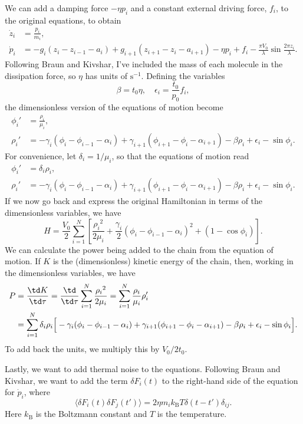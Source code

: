 \documentclass[11pt]{article}
\begin{document}
We can add a damping force $-\eta p_i$ and a constant external driving force, $f_i$, to the original equations, to obtain
\begin{align*}
\dot{z}_i&=\frac{p_i}{m_i},\\
\dot{p}_i&=-g_i(z_i-z_{i-1}-a_i)
	+g_{i+1}(z_{i+1}-z_i-a_{i+1})
	-\eta p_i+f_i
	-\frac{\pi V_0}{\lambda}\sin\frac{2\pi z_i}{\lambda}.
\end{align*}
Following Braun and Kivshar, I've included the mass of each molecule in the dissipation force, so $\eta$ has units of $\text{s}^{-1}$. Defining the variables
\[
\beta=t_0\eta,\quad
\epsilon_i = \frac{t_0}{p_0}f_i,
\]
the dimensionless version of the equations of motion become
\begin{align*}
\phi_i'&=\frac{\rho_i}{\mu_i},\\
\rho_i'&=-\gamma_i(\phi_i-\phi_{i-1}-\alpha_i)
	+\gamma_{i+1}(\phi_{i+1}-\phi_i-\alpha_{i+1})
	-\beta\rho_i+\epsilon_i
	-\sin\phi_i.
\end{align*}
For convenience, let $\delta_i=1/\mu_i$, so that the equations of motion read
\begin{align*}
\phi_i'&=\delta_i\rho_i,\\
\rho_i'&=-\gamma_i(\phi_i-\phi_{i-1}-\alpha_i)
	+\gamma_{i+1}(\phi_{i+1}-\phi_i-\alpha_{i+1})
	-\beta\rho_i+\epsilon_i
	-\sin\phi_i.
\end{align*}
If we now go back and express the original Hamiltonian in terms of the dimensionless variables, we have
\[
H=\frac{V_0}{2}\sum_{i=1}^N
	\left[\frac{{\rho_i}^2}{2\mu_i}
	+\frac{\gamma_i}{2}\left(\phi_i-\phi_{i-1}-\alpha_i\right)^2
	+\left(1-\cos\phi_i\right)\right].
\]
We can calculate the power being added to the chain from the equation of motion. If $K$ is the (dimensionless) kinetic energy of the chain, then, working in the dimensionless variables, we have
\begin{align*}
P&=\frac{\td K}{\td\tau}
	=\frac{\td}{\td\tau}\sum_{i=1}^N\frac{{\rho_i}^2}{2\mu_i}
	=\sum_{i=1}^N \frac{\rho_i}{\mu_i}\rho'_i\\
	&=\sum_{i=1}^N \delta_i\rho_i\Big[
		-\gamma_i(\phi_i-\phi_{i-1}-\alpha_i)
		+\gamma_{i+1}(\phi_{i+1}-\phi_i-\alpha_{i+1})
		-\beta \rho_i+\epsilon_i
		-\sin\phi_i\Big].
\end{align*}
To add back the units, we multiply this by $V_0/2t_0$.

Lastly, we want to add thermal noise to the equations. Following Braun and Kivshar, we want to add the term $\delta F_i(t)$ to the right-hand side of the equation for $\dot{p}_i$, where
\[
\langle\delta F_i(t)\delta F_j(t')\rangle=2\eta m_ik_\text{B}T\delta(t-t')\delta_{ij}.
\]
Here $k_\text{B}$ is the Boltzmann constant and $T$ is the temperature.
\end{document}
